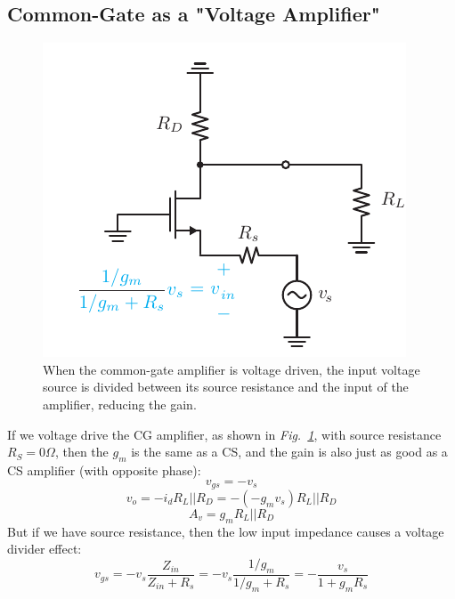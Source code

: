 \subsection{Common-Gate as a "Voltage Amplifier"}
\begin{figure}[tb]
\centering
\includegraphics[scale=1]{cgamp_vs_ac}
\caption{When the common-gate amplifier is voltage driven, the input voltage source is divided between its source resistance and the input of the amplifier, reducing the gain.}
\label{fig:cg_v_amp}
\end{figure}
If we voltage drive the CG amplifier, as shown in \emph{Fig.~\ref{fig:cg_v_amp}}, with source resistance $R_S = 0\Omega$, then the $g_m$ is the same as a CS, and the gain is also just as good as a CS amplifier (with opposite phase):
    \begin{equation}
        v_{gs} = -v_s 
    \end{equation}
    \begin{equation}
        v_{o} = - i_d R_L||R_D =  - (-g_m v_s) R_L||R_D 
    \end{equation}
    \begin{equation}
        A_v = g_m R_L||R_D
    \end{equation}
But if we have source resistance, then the low input impedance causes a voltage divider effect:
    \begin{equation}
        v_{gs} = -v_s \frac{Z_{in}}{Z_{in} + R_s} = -v_s \frac{1/g_m}{1/g_m + R_s} = - \frac{v_s}{1 + g_m R_s}
    \end{equation}
